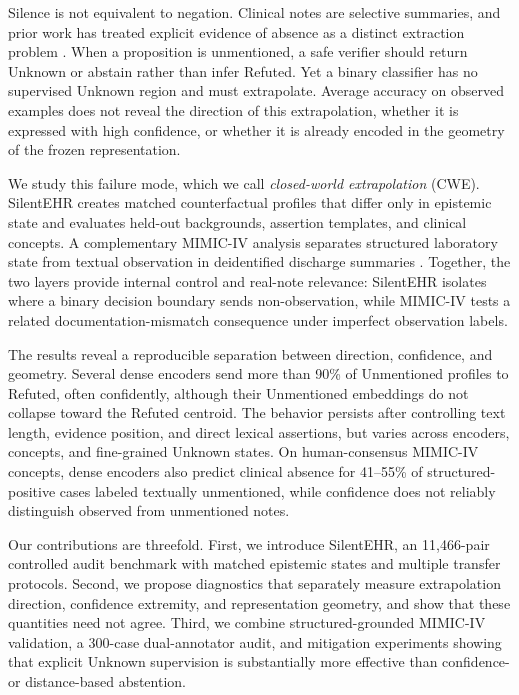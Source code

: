 \documentclass[11pt]{article}
\begin{document}
Silence is not equivalent to negation. Clinical notes are selective summaries,
and prior work has treated explicit evidence of absence as a distinct extraction
problem \citep{carter-etal-2016-evidence}. When a proposition is unmentioned, a
safe verifier should return Unknown or abstain rather than infer Refuted. Yet a
binary classifier has no supervised Unknown region and must extrapolate. Average
accuracy on observed examples does not reveal the direction of this
extrapolation, whether it is expressed with high confidence, or whether it is
already encoded in the geometry of the frozen representation.

We study this failure mode, which we call \emph{closed-world extrapolation}
(CWE). SilentEHR creates matched counterfactual profiles that differ only in
epistemic state and evaluates held-out backgrounds, assertion templates, and
clinical concepts. A complementary MIMIC-IV analysis separates structured
laboratory state from textual observation in deidentified discharge summaries
\citep{johnson-etal-2023-mimiciv,johnson-etal-2023-mimicnote}. Together, the two
layers provide internal control and real-note relevance: SilentEHR isolates
where a binary decision boundary sends non-observation, while MIMIC-IV tests a
related documentation-mismatch consequence under imperfect observation labels.

The results reveal a reproducible separation between direction, confidence, and
geometry. Several dense encoders send more than 90\% of Unmentioned profiles to
Refuted, often confidently, although their Unmentioned embeddings do not
collapse toward the Refuted centroid. The behavior persists after controlling
text length, evidence position, and direct lexical assertions, but varies across
encoders, concepts, and fine-grained Unknown states. On human-consensus MIMIC-IV
concepts, dense encoders also predict clinical absence for 41--55\% of
structured-positive cases labeled textually unmentioned, while confidence does
not reliably distinguish observed from unmentioned notes.

Our contributions are threefold. First, we introduce SilentEHR, an 11{,}466-pair
controlled audit benchmark with matched epistemic states and multiple transfer
protocols. Second, we propose diagnostics that separately measure extrapolation
direction, confidence extremity, and representation geometry, and show that
these quantities need not agree. Third, we combine structured-grounded MIMIC-IV
validation, a 300-case dual-annotator audit, and mitigation experiments showing
that explicit Unknown supervision is substantially more effective than
confidence- or distance-based abstention.
\end{document}
